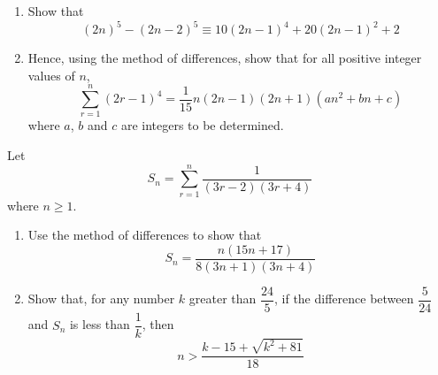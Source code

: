 \documentclass[leqno]{article}
\begin{document}
\begin{enumerate}[
  label=\textbf{\arabic*.},
  leftmargin=*,
  topsep=0pt,
  partopsep=0pt,
  parsep=0pt
]
\newpage

\questionitem

\begin{enumerate}[label=\textbf{(\alph*)}]
  \item Show that
  \[
  (2n)^5-(2n-2)^5 \equiv 10(2n-1)^4+20(2n-1)^2+2
  \]
  \item Hence, using the method of differences, show that for all positive integer values of $n$,
  \[
  \sum_{r=1}^{n}(2r-1)^4=\frac{1}{15}n(2n-1)(2n+1)(an^2+bn+c)
  \]
  where $a$, $b$ and $c$ are integers to be determined.  \\
\end{enumerate}

\newpage

\questionitem

Let
\[
S_n = \sum_{r=1}^{n} \frac{1}{(3r-2)(3r+4)}
\]
where $n \geq 1$. \\

\begin{enumerate}[label=\textbf{(\alph*)}]
  \item Use the method of differences to show that
  \[
  S_n = \frac{n(15n+17)}{8(3n+1)(3n+4)}
  \]
  \item Show that, for any number $k$ greater than $\dfrac{24}{5}$, if the difference between $\dfrac{5}{24}$ and $S_n$ is less than $\dfrac{1}{k}$, then
  \[
  n > \frac{k - 15 + \sqrt{k^2 + 81}}{18}
  \]
\end{enumerate}
\end{enumerate}
\end{document}
